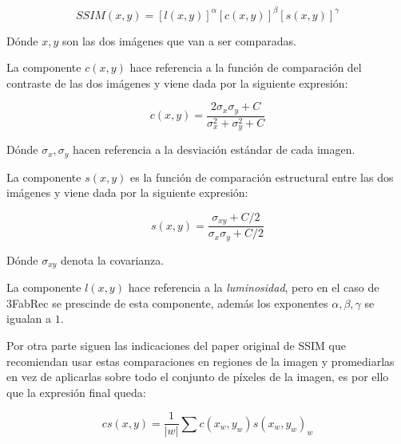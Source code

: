             \begin{equation*}
                SSIM(x,y)=[l(x,y)]^\alpha[c(x,y)]^{\beta}[s(x,y)]^{\gamma}
            \end{equation*}

            \medskip

            \noindent Dónde $x,y$ son las dos imágenes que van a ser comparadas.

            \medskip

            \noindent La componente $c(x,y)$ hace referencia a la función de comparación del contraste de las dos imágenes y viene dada por la siguiente expresión: 

            \begin{equation*}
                c(x,y)=\frac{2\sigma_x \sigma_y + C}{\sigma_x^2+ \sigma_y^2+C}
            \end{equation*}

            \noindent Dónde $\sigma_x, \sigma_y$ hacen referencia a la desviación estándar de cada imagen.

            \medskip

            \noindent La componente $s(x,y)$ es la función de comparación estructural entre las dos imágenes y viene dada por la siguiente expresión:

            \begin{equation*}
                s(x,y)=\frac{\sigma_{xy}+C/2}{\sigma_x \sigma_y +C/2}
            \end{equation*}

            \noindent Dónde $\sigma_{xy}$ denota la covarianza.

            \medskip

            \noindent La componente $l(x,y)$ hace referencia a la \textit{luminosidad}, pero en el caso de 3FabRec se prescinde de esta componente, además los exponentes $\alpha, \beta , \gamma$ se igualan a $1$.

            \medskip

            \noindent Por otra parte siguen las indicaciones del paper original de SSIM que recomiendan usar estas comparaciones en regiones de la imagen y promediarlas en vez de aplicarlas sobre todo el conjunto de píxeles de la imagen, es por ello que la expresión final queda:

            \begin{equation*}
                cs(x,y)=\frac{1}{|w|} \sum{c(x_w,y_w)s(x_w,y_w)}_w
            \end{equation*}

